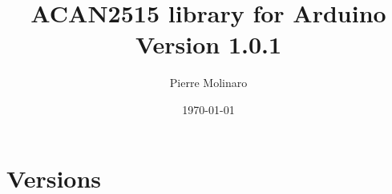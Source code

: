 \documentclass[10pt, a4paper, obeyspaces, openany]{extarticle}
\begin{document}
 


\title{\bf \Huge{ACAN2515 library for Arduino\\Version 1.0.1}}
\author{Pierre Molinaro}
\date {\today}

\maketitle


\tableofcontents


\section{Versions}
\end{document}
